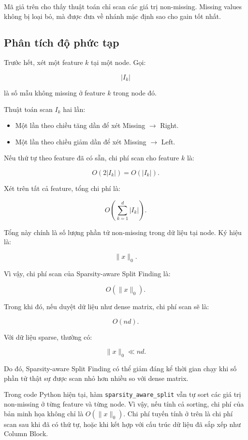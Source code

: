 Mã giả trên cho thấy thuật toán chỉ scan các giá trị non-missing. Missing values không bị loại bỏ, mà được đưa về nhánh mặc định sao cho gain tốt nhất.

\subsection{Phân tích độ phức tạp}

Trước hết, xét một feature $k$ tại một node. Gọi:

\[
|I_k|
\]

là số mẫu không missing ở feature $k$ trong node đó.

Thuật toán scan $I_k$ hai lần:

\begin{itemize}
    \item Một lần theo chiều tăng dần để xét Missing $\rightarrow$ Right.
    \item Một lần theo chiều giảm dần để xét Missing $\rightarrow$ Left.
\end{itemize}

Nếu thứ tự theo feature đã có sẵn, chi phí scan cho feature $k$ là:

\[
O(2|I_k|) = O(|I_k|).
\]

Xét trên tất cả feature, tổng chi phí là:

\[
O\left(\sum_{k=1}^{d} |I_k|\right).
\]

Tổng này chính là số lượng phần tử non-missing trong dữ liệu tại node. Ký hiệu là:

\[
\|x\|_0.
\]

Vì vậy, chi phí scan của Sparsity-aware Split Finding là:

\[
O(\|x\|_0).
\]

Trong khi đó, nếu duyệt dữ liệu như dense matrix, chi phí scan sẽ là:

\[
O(nd).
\]

Với dữ liệu sparse, thường có:

\[
\|x\|_0 \ll nd.
\]

Do đó, Sparsity-aware Split Finding có thể giảm đáng kể thời gian chạy khi số phần tử thật sự được scan nhỏ hơn nhiều so với dense matrix.

Trong code Python hiện tại, hàm \texttt{sparsity\_aware\_split} vẫn tự sort các giá trị non-missing ở từng feature và từng node. Vì vậy, nếu tính cả sorting, chi phí của bản minh họa không chỉ là $O(\|x\|_0)$. Chi phí tuyến tính ở trên là chi phí scan sau khi đã có thứ tự, hoặc khi kết hợp với cấu trúc dữ liệu đã sắp xếp như Column Block.

